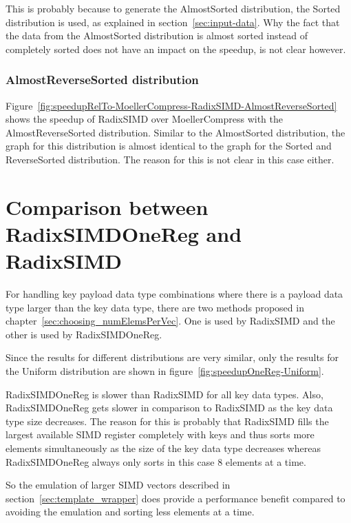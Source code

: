 \documentclass[12pt, a4paper, openright, twoside]{tiarbeit}
\begin{document}
This is probably because to generate the AlmostSorted distribution,
the Sorted distribution is used, as explained in section~\ref{sec:input-data}.
Why the fact that the data from the AlmostSorted distribution is
almost sorted instead of completely sorted does not have an impact on the
speedup, is not clear however.

\subsubsection*{AlmostReverseSorted distribution}


Figure~\ref{fig:speedupRelTo-MoellerCompress-RadixSIMD-AlmostReverseSorted} shows the speedup of RadixSIMD
over MoellerCompress with the AlmostReverseSorted distribution.
Similar to the AlmostSorted distribution, the graph for this distribution is
almost identical to the graph for the Sorted and ReverseSorted distribution.
The reason for this is not clear in this case either.

\section{Comparison between RadixSIMDOneReg and RadixSIMD}
\label{sec:comparingRadixSIMDAndRadixSIMDOneReg}

For handling key payload data type combinations where there is a payload data
type larger than the key data type, there are two methods
proposed in chapter~\ref{sec:choosing_numElemsPerVec}. One is used by RadixSIMD
and the other is used by RadixSIMDOneReg.

Since the results for different distributions are very similar, only the
results for the Uniform distribution are shown in figure~\ref{fig:speedupOneReg-Uniform}.


RadixSIMDOneReg is slower than RadixSIMD for all key data
types. Also, RadixSIMDOneReg gets slower in comparison
to RadixSIMD as the key data type size decreases. The reason for this is
probably that RadixSIMD fills the largest available SIMD register completely
with keys and thus sorts more elements simultaneously as the size of the key
data type decreases whereas RadixSIMDOneReg always only sorts in this case 8
elements at a time.

So the emulation of larger SIMD vectors described in
section~\ref{sec:template_wrapper} does provide a performance benefit
compared to avoiding the emulation and sorting less elements at a time.
\end{document}
